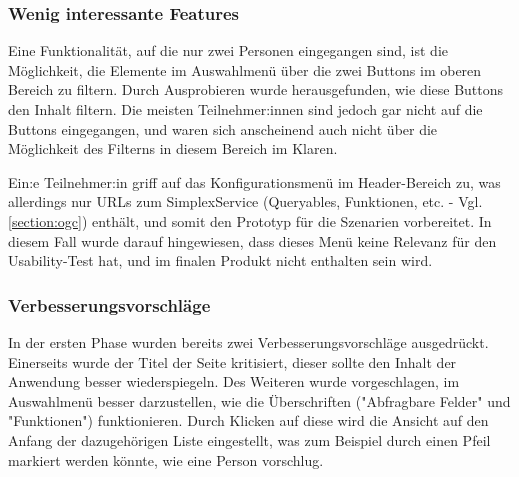 \subsubsection{Wenig interessante Features}

Eine Funktionalität, auf die nur zwei Personen eingegangen sind, ist die Möglichkeit, die Elemente im Auswahlmenü über die zwei Buttons im oberen Bereich zu filtern. Durch Ausprobieren wurde herausgefunden, wie diese Buttons den Inhalt filtern. Die meisten Teilnehmer:innen sind jedoch gar nicht auf die Buttons eingegangen, und waren sich anscheinend auch nicht über die Möglichkeit des Filterns in diesem Bereich im Klaren.

Ein:e Teilnehmer:in griff auf das Konfigurationsmenü im Header-Bereich zu, was allerdings nur URLs zum SimplexService (Queryables, Funktionen, etc. - Vgl. \ref{section:ogc}) enthält, und somit den Prototyp für die Szenarien vorbereitet. In diesem Fall wurde darauf hingewiesen, dass dieses Menü keine Relevanz für den Usability-Test hat, und im finalen Produkt nicht enthalten sein wird.

\subsubsection{Verbesserungsvorschläge}

In der ersten Phase wurden bereits zwei Verbesserungsvorschläge ausgedrückt. Einerseits wurde der Titel der Seite kritisiert, dieser sollte den Inhalt der Anwendung besser wiederspiegeln. Des Weiteren wurde vorgeschlagen, im Auswahlmenü besser darzustellen, wie die Überschriften ("Abfragbare Felder" und "Funktionen") funktionieren. Durch Klicken auf diese wird die Ansicht auf den Anfang der dazugehörigen Liste eingestellt, was zum Beispiel durch einen Pfeil markiert werden könnte, wie eine Person vorschlug.
